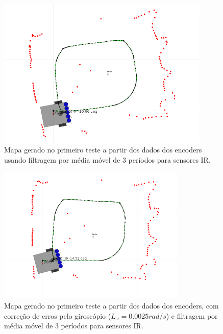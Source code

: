 \begin{figure}[H]
	\centering
	\includegraphics[width=0.9\textwidth]{./figuras/testes/teste1/mapa_encoders.png}
	\caption{Mapa gerado no primeiro teste a partir dos dados dos encoders usando filtragem por média móvel de 3 períodos para sensores IR.}
	\label{fig:teste1_mapa_encoders}
\end{figure}

\begin{figure}[H]
	\centering
	\includegraphics[width=0.8\textwidth]{./figuras/testes/teste1/mapa_encoders_giro.png}
	\caption{Mapa gerado no primeiro teste a partir dos dados dos encoders, com correção de erros pelo giroscópio ($L_\omega = 0.0025 \unit{rad/s}$) e filtragem por média móvel de 3 períodos para sensores IR.}
	\label{fig:teste1_mapa_encoders_giro}
\end{figure}

